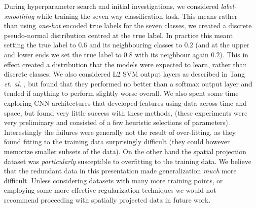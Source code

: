 \documentclass[fleqn,10pt]{wlscirep}
\begin{document}

During hyperparameter search and initial investigations, we considered {\em label-smoothing} \cite{Pereyra2017} while training the seven-way classification task. This means rather than using {\em one-hot} encoded true labels for the seven classes, we created a discrete pseudo-normal distribution centred at the true label. In practice this meant setting the true label to $0.6$ and its neighbouring classes to $0.2$ (and at the upper and lower ends we set the true label to $0.8$ with its neighbour again $0.2$). This in effect created a distribution that the models were expected to learn, rather than discrete classes. We also considered L2 SVM output layers as described in Tang {\em et. al.} \cite{Tang2013a}, but found that they performed no better than a softmax output layer and tended if anything to perform slightly worse overall. We also spent some time exploring CNN architectures that developed features using data across time and space, but found very little success with these methods, (these experiments were very preliminary and consisted of a few heuristic selections of parameters). Interestingly the failures were generally not the result of over-fitting, as they found fitting to the training data surprisingly difficult (they could however memorize smaller subsets of the data). On the other hand the spatial projection dataset was {\em particularly} susceptible to overfitting to the training data. We believe that the redundant data in this presentation made generalization {\em much} more difficult. Unless considering datasets with many more training points, or employing some more effective regularization techniques we would not recommend proceeding with spatially projected data in future work. 
\end{document}
